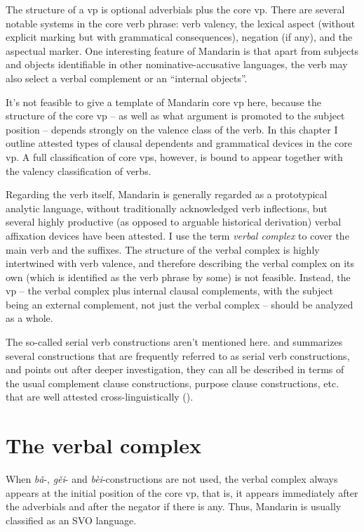 \documentclass[UTF8, a4paper, oneside, scheme=plain, 12pt]{ctexrep}
\newcommand*{\citesec}[1]{\S~{#1}}
\newcommand*{\term}[1]{\emph{#1}}
\newcommand{\form}[1]{\emph{#1}}
\begin{document}
The structure of a \acs{vp} is 
optional adverbials
plus the core \acs{vp}.
There are several notable systems in the core verb phrase: 
verb valency, 
the lexical aspect (without explicit marking but with grammatical consequences), 
negation (if any), 
and the aspectual marker. 
One interesting feature of Mandarin is 
that apart from subjects and objects 
identifiable in other nominative-accusative languages,
the verb may also select 
a verbal complement or an ``internal objects''.

It's not feasible to give a template of Mandarin core \acs{vp} here,
because the structure of the core \acs{vp} 
-- as well as what argument is promoted to the subject position -- depends
strongly on the valence class of the verb.
In this chapter I outline attested types of clausal dependents 
and grammatical devices in the core \acs{vp}.
A full classification of core \acs{vp}s, 
however, is bound to appear together with 
the valency classification of verbs.

Regarding the verb itself,
Mandarin is generally regarded as a prototypical analytic language,
without traditionally acknowledged verb inflections,
but several highly productive (as opposed to arguable historical derivation) 
verbal affixation devices have been attested.
I use the term \term{verbal complex} to cover 
the main verb and the suffixes.
The structure of the verbal complex is highly intertwined 
with verb valence, 
and therefore describing the verbal complex on its own 
(which is identified as the verb phrase by some)
is not feasible.
Instead, the \acs{vp} 
-- the verbal complex plus internal clausal complements, 
with the subject being an external complement,
not just the verbal complex --
should be analyzed as a whole.

The so-called serial verb constructions aren't mentioned here.
\citet{paul2008serial} and \citet[\citesec{9.4}]{deng2010formal} 
summarizes several constructions that are
frequently referred to as serial verb constructions,
and points out after deeper investigation,
they can all be described in terms of the usual complement clause constructions,
purpose clause constructions, etc. 
that are well attested cross-linguistically ().



\section{The verbal complex}

When \form{bǎ}-, \form{gěi}- and \form{bèi}-constructions are not used,
the verbal complex always appears at the initial position 
of the core \acs{vp}, 
that is, it appears immediately after the adverbials 
and after the negator if there is any. 
Thus, Mandarin is usually classified as an SVO language.
\end{document}
